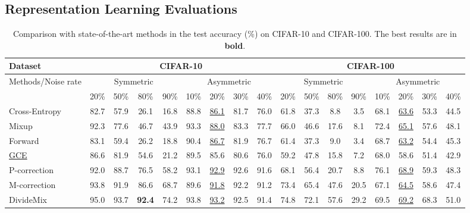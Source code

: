 \documentclass[10pt,twocolumn,letterpaper]{article}
\begin{document}
\vspace{-2pt}
\subsection{Representation Learning Evaluations}\label{sec:4.2}

\begin{table*}[h]
	\caption{Comparison with state-of-the-art methods in the test accuracy (\%) on CIFAR-10 and CIFAR-100. The best results are in \textbf{bold}.} \centering
	\small
	\setlength\tabcolsep{3.5pt}
	\begin{tabular}{l|cccc|cccc|cccc|cccc}
		\hline \multirow{1}{*}{Dataset} & \multicolumn{8}{c}{ CIFAR-10} & \multicolumn{8}{|c}{CIFAR-100} \\
		\hline \multirow{2}{*}{Methods/Noise rate} & \multicolumn{4}{c}{ Symmetric} & \multicolumn{4}{|c|}{Asymmetric}  & \multicolumn{4}{c}{ Symmetric} & \multicolumn{4}{|c}{Asymmetric} \\\cline{2-17}
		& 20\% & 50\% & 80\% & 90\% & 10\% & 20\% & 30\% & 40\% & 20\% & 50\% & 80\% & 90\% & 10\% & 20\% & 30\% & 40\% \\
		\hline	
		Cross-Entropy & 82.7 & 57.9 & 26.1 & 16.8 & 88.8 & \underline{86.1} & 81.7 & 76.0 & 61.8 & 37.3 & 8.8 & 3.5 & 68.1 & \underline{63.6} & 53.3 & 44.5 \\	
		Mixup~\cite{zhang2018mixup} & 92.3 & 77.6 & 46.7 & 43.9 & 93.3 & \underline{88.0} & 83.3 & 77.7  & 66.0 & 46.6 & 17.6 & 8.1 & 72.4 & \underline{65.1} & 57.6 & 48.1\\			
		Forward~\cite{PatriniRMNQ17} & 83.1 & 59.4 & 26.2 & 18.8 & 90.4 & \underline{86.7} & 81.9 & 76.7  & 61.4 & 37.3 & 9.0 & 3.4 & 68.7 & \underline{63.2} & 54.4 & 45.3\\		
		\underline{GCE}~\cite{zhang2018generalized} & 86.6 & 81.9 & 54.6 & 21.2 & 89.5 & 85.6 & 80.6 & 76.0 & 59.2 & 47.8 & 15.8 & 7.2 & 68.0 & 58.6 & 51.4 & 42.9\\
		P-correction~\cite{YiW19} & 92.0 & 88.7 & 76.5 & 58.2 & 93.1 & \underline{92.9} & 92.6 & 91.6 & 68.1 & 56.4 & 20.7 & 8.8 & 76.1 & \underline{68.9} & 59.3 & 48.3\\ 		
		M-correction~\cite{ArazoOAOM19} & 93.8 & 91.9 & 86.6 & 68.7 & 89.6 & \underline{91.8} & 92.2 & 91.2  & 73.4 & 65.4 & 47.6 & 20.5 & 67.1 & \underline{64.5} & 58.6 & 47.4 \\             					
		DivideMix~\cite{LiSH20} & 95.0 & {93.7} & \textbf{92.4} & 74.2 & 93.8 & \underline{93.2} & 92.5 & 91.4 & 74.8 & {72.1} & 57.6 & 29.2 & 69.5 & \underline{69.2} & 68.3 & 51.0 \\		

\end{tabular}
\end{table*}
\end{document}
